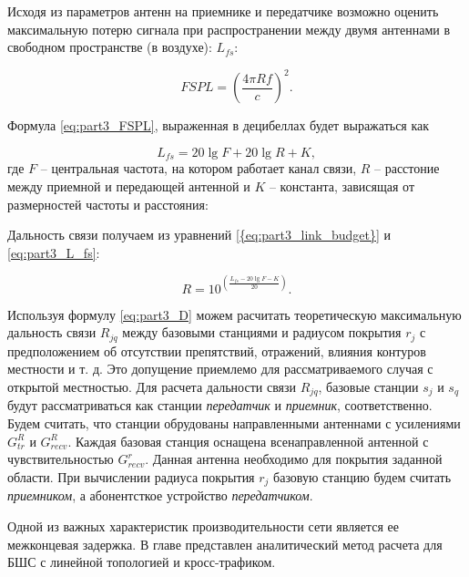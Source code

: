 Исходя из параметров антенн на приемнике и передатчике возможно оценить максимальную потерю сигнала при распространении между двумя антеннами в свободном пространстве (в воздухе): $L_{fs}$:

\begin{equation}
\label{eq:part3_FSPL}
FSPL = \left(\frac{4\pi R f}{c} \right)^2.
\end{equation}

Формула \cref{eq:part3_FSPL}, выраженная в децибеллах будет выражаться как

\begin{equation}
\label{eq:part3_L_fs}
L_{fs} = 20 \lg{F} + 20\lg{R} + K,
\end{equation}
где $F$ -- центральная частота, на котором работает канал связи, $R$ -- расстоние между приемной и передающей антенной и $K$ -- константа, зависящая от размерностей частоты и расстояния:

Дальность связи получаем из уравнений \cref{{eq:part3_link_budget}} и \cref{eq:part3_L_fs}:

\begin{equation}
\label{eq:part3_D}
R = 10^{\left(\frac{L_{fs} - 20\lg{F} - K}{20}\right)}.
\end{equation}

Используя формулу \cref{eq:part3_D} можем расчитать теоретическую максимальную дальность связи $ R_{jq}$ между базовыми станциями и радиусом покрытия $ r_j $ с предположением об отсутствии препятствий, отражений, влияния контуров местности и т. д. Это допущение приемлемо для рассматриваемого случая с открытой местностью. Для расчета дальности связи $R_{jq}$, базовые станции $s_j$ и $s_q$ будут рассматриваться как станции \textit{передатчик} и \textit{приемник}, соответственно. Будем считать, что станции обрудованы направленными антеннами с усилениями $G_{tr}^{R}$ и $G_{recv}^{R}$. Каждая базовая станция оснащена всенаправленной антенной с чувствительностью $G_ {recv}^{r}$. Данная антенна необходимо для покрытия заданной области. При вычислении радиуса покрытия $r_j$ базовую станцию будем считать \textit{приемником}, а абонентсткое устройство \textit{передатчиком}.

Одной из важных характеристик производительности сети является ее межконцевая задержка. В главе представлен аналитический метод расчета для БШС с линейной топологией и кросс-трафиком.

